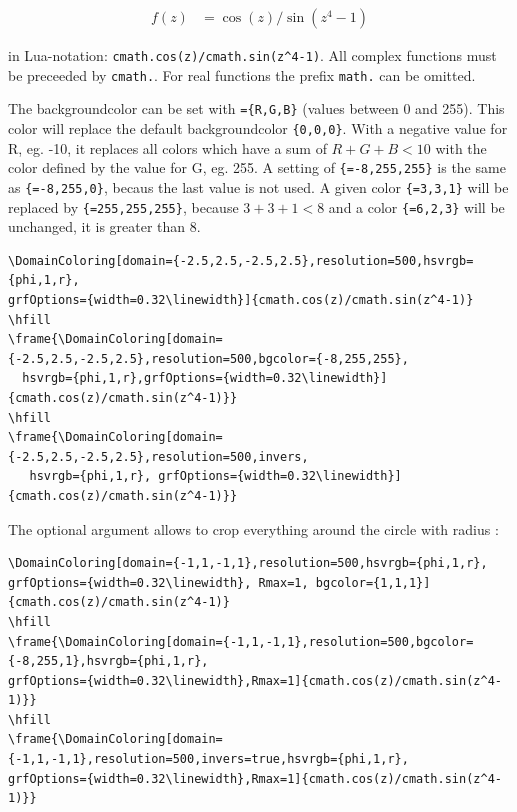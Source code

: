 \documentclass[fontsize=11pt,english,BCOR=10mm,DIV=12,bibliography=totoc,parskip=false,headings=small,
    headinclude=false,footinclude=false,oneside]{pst-doc}
\begin{document}
\begin{align}
 f(z) &= \cos(z)/\sin(z^4-1) 
\end{align}

in Lua-notation: \verb|cmath.cos(z)/cmath.sin(z^4-1)|. All complex functions
must be preceeded by \texttt{cmath.}. For real functions the prefix \texttt{math.}
can be omitted.


The backgroundcolor can be set with \texttt{=\{R,G,B\}} (values between 0 and 255).
This color will replace the default backgroundcolor \texttt{\{0,0,0\}}. With a negative  value
for R, eg. -10, it replaces all colors which have a sum of $R+G+B <10$ with the color defined by
the value for G, eg. 255. A setting of \texttt{\{=-8,255,255\}} is the same as
\texttt{\{=-8,255,0\}}, becaus the last value is not used. A given color
\texttt{\{=3,3,1\}} will be replaced by \texttt{\{=255,255,255\}}, because $3+3+1<8$ and a color
\texttt{\{=6,2,3\}} will be unchanged, it is greater than 8. 


\begin{lstlisting}
\DomainColoring[domain={-2.5,2.5,-2.5,2.5},resolution=500,hsvrgb={phi,1,r},
grfOptions={width=0.32\linewidth}]{cmath.cos(z)/cmath.sin(z^4-1)}
\hfill
\frame{\DomainColoring[domain={-2.5,2.5,-2.5,2.5},resolution=500,bgcolor={-8,255,255},
  hsvrgb={phi,1,r},grfOptions={width=0.32\linewidth}]{cmath.cos(z)/cmath.sin(z^4-1)}}
\hfill
\frame{\DomainColoring[domain={-2.5,2.5,-2.5,2.5},resolution=500,invers,
   hsvrgb={phi,1,r}, grfOptions={width=0.32\linewidth}]{cmath.cos(z)/cmath.sin(z^4-1)}}
\end{lstlisting}

\noindent
{}
\hfill
{}
\hfill
{}







The optional argument  allows to crop everything around the circle with radius
:

\begin{lstlisting}
\DomainColoring[domain={-1,1,-1,1},resolution=500,hsvrgb={phi,1,r},
grfOptions={width=0.32\linewidth}, Rmax=1, bgcolor={1,1,1}]{cmath.cos(z)/cmath.sin(z^4-1)}
\hfill
\frame{\DomainColoring[domain={-1,1,-1,1},resolution=500,bgcolor={-8,255,1},hsvrgb={phi,1,r},
grfOptions={width=0.32\linewidth},Rmax=1]{cmath.cos(z)/cmath.sin(z^4-1)}}
\hfill
\frame{\DomainColoring[domain={-1,1,-1,1},resolution=500,invers=true,hsvrgb={phi,1,r},
grfOptions={width=0.32\linewidth},Rmax=1]{cmath.cos(z)/cmath.sin(z^4-1)}}
\end{lstlisting}
\end{document}
